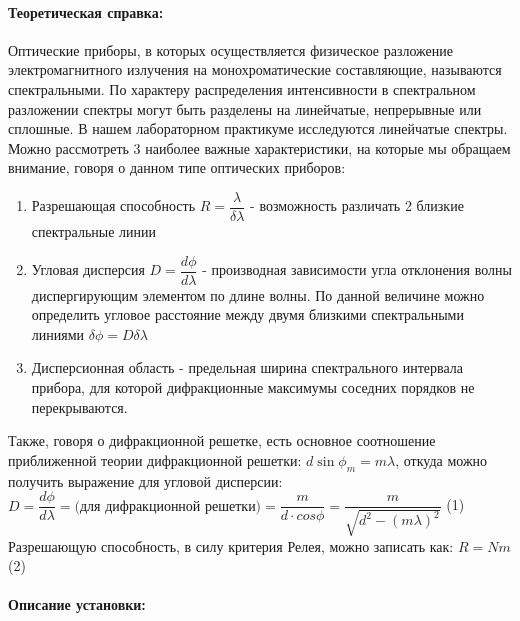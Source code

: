 \documentclass[a4paper,12pt]{article}
\begin{document}
\paragraph{Теоретическая справка:} Оптические приборы, в которых осуществляется физическое разложение электромагнитного излучения на монохроматические составляющие, называются спектральными. По характеру распределения интенсивности в спектральном разложении спектры могут быть разделены на линейчатые, непрерывные или сплошные. В нашем лабораторном практикуме исследуются линейчатые спектры. \\
Можно рассмотреть 3 наиболее важные характеристики, на которые мы обращаем внимание, говоря о данном типе оптических приборов:
\begin{enumerate}
\itemsep0em
\item Разрешающая способность $R = \dfrac{\lambda}{\delta \lambda}$ - возможность различать 2 близкие спектральные линии
\item Угловая дисперсия $D = \dfrac{d\phi}{d\lambda}$ - производная зависимости угла отклонения волны диспергирующим элементом по длине волны. По данной величине можно определить угловое расстояние между двумя близкими спектральными линиями $\delta\phi = D\delta\lambda$
\item Дисперсионная область - предельная ширина спектрального интервала прибора, для которой дифракционные максимумы соседних порядков не перекрываются.
\end{enumerate}
Также, говоря о дифракционной решетке, есть основное соотношение приближенной теории дифракционной решетки: 
$d\sin\phi_m = m\lambda$, откуда можно получить выражение для угловой дисперсии:
 $D = \dfrac{d\phi}{d\lambda} = \text{(для дифракционной решетки)} =\dfrac{m}{d \cdot cos\phi} = \dfrac{m}{\sqrt{d^2-(m\lambda)^2}}$ (1)\\
 Разрешающую способность, в силу критерия Релея, можно записать как: $R = Nm$ (2)

\paragraph{Описание установки:}
\end{document}
